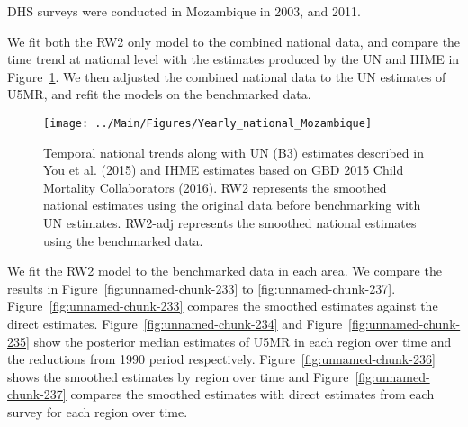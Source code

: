 \documentclass[12pt]{article}\usepackage[]{graphicx}\usepackage[]{color}
\newenvironment{knitrout}{}{} %
\begin{document}


DHS surveys were conducted in Mozambique in 2003, and 2011.

We fit both the RW2 only model to the combined national data, and compare the time trend at national level with the estimates produced by the UN and IHME in Figure~\ref{fig:unnamed-chunk-232}. We then adjusted the combined national data to the UN estimates of U5MR, and refit the models on the benchmarked data. 

\begin{knitrout}
\color{fgcolor}\begin{figure}[bht]

{\centering \texttt{[image: ../Main/Figures/Yearly\_national\_Mozambique]} 

}

\caption[Temporal national trends along with UN (B3) estimates described in You et al]{Temporal national trends along with UN (B3) estimates described in You et al. (2015) and IHME estimates based on GBD 2015 Child Mortality Collaborators (2016). RW2 represents the smoothed national estimates using the original data before benchmarking with UN estimates. RW2-adj represents the smoothed national estimates using the benchmarked data.}\label{fig:unnamed-chunk-232}
\end{figure}


\end{knitrout}
 

We fit the RW2 model to the benchmarked data in each area. 
We compare the results in Figure~\ref{fig:unnamed-chunk-233} to \ref{fig:unnamed-chunk-237}.
Figure~\ref{fig:unnamed-chunk-233} compares the smoothed estimates against the direct estimates. Figure~\ref{fig:unnamed-chunk-234} and Figure~\ref{fig:unnamed-chunk-235} show the posterior median estimates of U5MR in each region over time and the reductions from 1990 period respectively.
Figure~\ref{fig:unnamed-chunk-236} shows the smoothed estimates by region over time and Figure~\ref{fig:unnamed-chunk-237} compares the smoothed estimates with direct estimates from each survey for each region over time.


\end{document}
